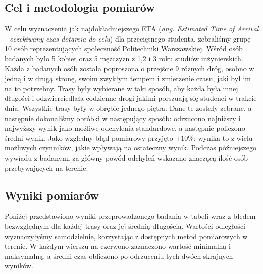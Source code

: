 \documentclass[14pt,a4paper]{extarticle}
\begin{document}
\subsection{Cel i metodologia pomiarów}
W celu wyznaczenia jak najdokładniejszego ETA (\textit{ang. Estimated Time of Arrival - oczekiwany czas dotarcia do celu}) dla przeciętnego studenta, zebraliśmy grupę 10 osób reprezentujących społeczność Politechniki Warszawskiej. Wśród osób badanych było 5 kobiet oraz 5 mężczyzn z 1,2 i 3 roku studiów inżynierskich. Każda z badanych osób została poproszona o przejście 9 różnych dróg, osobno w jedną i w drugą stronę, swoim zwykłym tempem i zmierzenie czasu, jaki był im na to potrzebny. Trasy były wybierane w taki sposób, aby każda była innej długości i odzwierciedlała codzienne drogi jakimi porszuają się studenci w trakcie dnia. Wszystkie trasy były w obrębie jednego piętra. Dane te zostały zebrane, a następnie dokonaliśmy obróbki w następujący sposób: odrzucono najniższy i najwyższy wynik jako możliwe odchylenia standardowe, a następnie policzono średni wynik. Jako względny błąd pomiarowy przyjęto $\pm 10\%$; wynika to z wielu możliwych czynników, jakie wpływają na ostateczny wynik. Podczas późniejszego wywiadu z badanymi za główny powód odchyleń wskazano znaczącą ilość osób przebywających na terenie.

\subsection{Wyniki pomiarów}
Poniżej przedstawiono wyniki przeprowadzonego badania w tabeli wraz z błędem bezwzględnym dla każdej trasy oraz jej średnią długością. Wartości odległości wyznaczyłyśmy samodzielnie, korzystając z dostępnych metod pomiarowych w terenie. W każdym wierszu na czerwono zaznaczono wartość minimalną i maksymalną, a średni czas obliczono po odrzuceniu tych dwóch skrajnych wyników.
\end{document}
